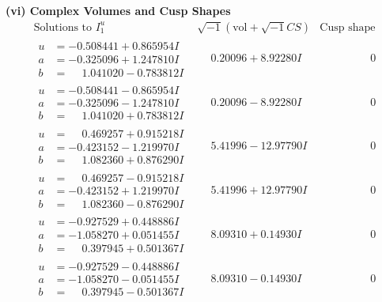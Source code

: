 \documentclass[1p]{elsarticle_modified}
\theoremstyle{definition}
\newcommand{\I}{\sqrt{-1}}
\begin{document}
\newpage\flushleft \textbf{(vi) Complex Volumes and Cusp Shapes}
$$\begin{array}{c|c|c}  
\text{Solutions to }I^u_{1}& \I (\text{vol} + \sqrt{-1}CS) & \text{Cusp shape}\\
 \hline 
\begin{aligned}
u &= -0.508441 + 0.865954 I \\
a &= -0.325096 + 1.247810 I \\
b &= \phantom{-}1.041020 - 0.783812 I\end{aligned}
 & \phantom{-}0.20096 + 8.92280 I & \phantom{-0.000000 } 0 \\ \hline\begin{aligned}
u &= -0.508441 - 0.865954 I \\
a &= -0.325096 - 1.247810 I \\
b &= \phantom{-}1.041020 + 0.783812 I\end{aligned}
 & \phantom{-}0.20096 - 8.92280 I & \phantom{-0.000000 } 0 \\ \hline\begin{aligned}
u &= \phantom{-}0.469257 + 0.915218 I \\
a &= -0.423152 - 1.219970 I \\
b &= \phantom{-}1.082360 + 0.876290 I\end{aligned}
 & \phantom{-}5.41996 - 12.97790 I & \phantom{-0.000000 } 0 \\ \hline\begin{aligned}
u &= \phantom{-}0.469257 - 0.915218 I \\
a &= -0.423152 + 1.219970 I \\
b &= \phantom{-}1.082360 - 0.876290 I\end{aligned}
 & \phantom{-}5.41996 + 12.97790 I & \phantom{-0.000000 } 0 \\ \hline\begin{aligned}
u &= -0.927529 + 0.448886 I \\
a &= -1.058270 + 0.051455 I \\
b &= \phantom{-}0.397945 + 0.501367 I\end{aligned}
 & \phantom{-}8.09310 + 0.14930 I & \phantom{-0.000000 } 0 \\ \hline\begin{aligned}
u &= -0.927529 - 0.448886 I \\
a &= -1.058270 - 0.051455 I \\
b &= \phantom{-}0.397945 - 0.501367 I\end{aligned}
 & \phantom{-}8.09310 - 0.14930 I & \phantom{-0.000000 } 0 \\ \hline\begin{aligned}

\end{aligned}
\end{array}$$
\end{document}
